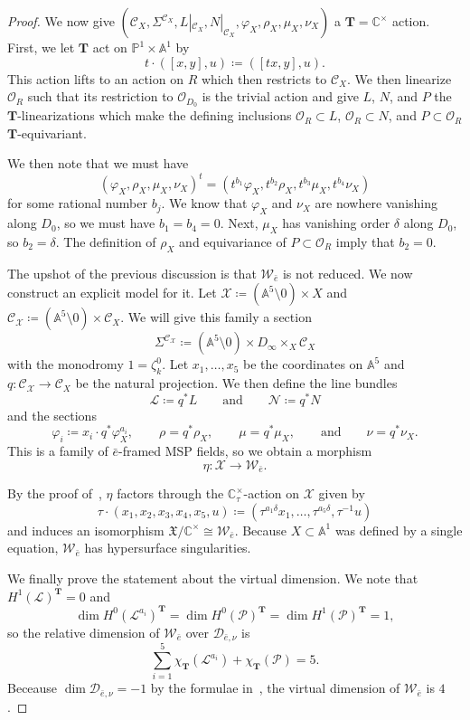\documentclass{amsart}
\theoremstyle{definition}
\theoremstyle{remark}
\theoremstyle{plain}
\theoremstyle{definition}
\theoremstyle{remark}
\newcommand{\A}{\mathbb{A}}
\newcommand{\C}{\mathbb{C}}
\newcommand{\T}{\mathbf{T}}
\renewcommand{\P}{\mathbb{P}}
\newcommand{\mc}[1]{\mathcal{#1}}
\newcommand{\mf}[1]{\mathfrak{#1}}
\newcommand{\1}{\mathbf{1}}
\newcommand{\2}{\mathbf{2}}
\newcommand{\3}{\mathbf{3}}
\begin{document}
\begin{proof}
    We now give $(\mc{C}_X, \Sigma^{\mc{C}_X}, L|_{\mc{C}_X}, N|_{\mc{C}_X}, \varphi_X, \rho_X, \mu_X, \nu_X)$ a $\T = \C^{\times}$ action. First, we let $\T$ act on $\P^1 \times \A^1$ by
    \[ t \cdot ([x,y], u) \coloneqq ([tx,y],u). \]
    This action lifts to an action on $R$ which then restricts to $\mc{C}_X$. We then linearize $\mc{O}_R$ such that its restriction to $\mc{O}_{D_0}$ is the trivial action and give $L$, $N$, and $P$ the $\T$-linearizations which make the defining inclusions $\mc{O}_R \subset L$, $\mc{O}_R \subset N$, and $P \subset \mc{O}_R$ $\T$-equivariant.

    We then note that we must have
    \[ (\varphi_X, \rho_X, \mu_X, \nu_X)^t = (t^{b_1} \varphi_X, t^{b_2} \rho_X, t^{b_3} \mu_X, t^{b_4} \nu_X) \]
    for some rational number $b_j$. We know that $\varphi_X$ and $\nu_X$ are nowhere vanishing along $D_0$, so we must have $b_1 = b_4 = 0$. Next, $\mu_X$ has vanishing order $\delta$ along $D_0$, so $b_2 = \delta$. The definition of $\rho_X$ and equivariance of $P \subset \mc{O}_R$ imply that $b_2 = 0$.

    The upshot of the previous discussion is that $\mc{W}_{\bar{e}}$ is not reduced. We now construct an explicit model for it. Let $\mc{X} \coloneqq (\A^5 \setminus 0) \times X$ and $\mc{C}_{\mc{X}} \coloneqq (\A^5 \setminus 0) \times \mc{C}_X$. We will give this family a section
    \[ \Sigma^{\mc{C}_{\mc{X}}} \coloneqq (\A^5 \setminus 0) \times D_{\infty} \times_X \mc{C}_X \]
    with the monodromy $1 = \zeta_k^0$. Let $x_1, \ldots, x_5$ be the coordinates on $\A^5$ and $q \colon \mc{C}_{\mc{X}} \to \mc{C}_X$ be the natural projection. We then define the line bundles
    \[ \mc{L} \coloneqq q^* L \qquad \text{and}  \qquad\mc{N} \coloneqq q^* N \]
    and the sections
    \[ \varphi_i \coloneqq x_i \cdot q^* \varphi^{a_i}_X, \qquad \rho = q^* \rho_X, \qquad \mu = q^* \mu_X, \qquad \text{and} \qquad \nu = q^* \nu_X. \]
    This is a family of $\bar{e}$-framed MSP fields, so we obtain a morphism
    \[ \eta \colon \mc{X} \to \mc{W}_{\bar{e}}. \]

    By the proof of~\cite[Lemma 8.1]{msp3}, $\eta$ factors through the $\C^{\times}_{\tau}$-action on $\mc{X}$ given by
    \[ \tau \cdot (x_1, x_2, x_3, x_4, x_5, u) \coloneqq (\tau^{a_1\delta} x_1, \ldots, \tau^{a_5 \delta}, \tau^{-1}u) \]
    and induces an isomorphism $\mf{X} / \C^{\times} \cong \mc{W}_{\bar{e}}$. Because $X \subset \A^1$ was defined by a single equation, $\mc{W}_{\bar{e}}$ has hypersurface singularities.

    We finally prove the statement about the virtual dimension. We note that $H^1(\mc{L})^{\T} = 0$ and
    \[ \dim H^0(\mc{L}^{a_i})^{\T} = \dim H^0(\mc{P})^{\T} =\dim H^1(\mc{P})^{\T} = 1, \]
    so the relative dimension of $\mc{W}_{\bar{e}}$ over $\mc{D}_{\bar{e}, \nu}$ is
    \[ \sum_{i=1}^5\chi_{\T}(\mc{L}^{a_i}) + \chi_{\T}(\mc{P}) = 5. \]
    Beceause $\dim \mc{D}_{\bar{e}, \nu} = -1$ by the formulae in~\cite[\S 4]{msp3}, the virtual dimension of $\mc{W}_{\bar{e}}$ is $4$.
\end{proof}
\end{document}
